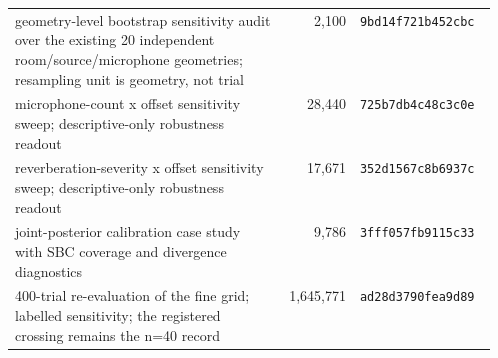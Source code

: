 \begin{tabular}{@{}p{0.56\linewidth}rl@{}}
geometry-level bootstrap sensitivity audit over the existing 20 independent room/source/microphone geometries; resampling unit is geometry, not trial &     2,100 & \texttt{9bd14f721b452cbc} \\
microphone-count x offset sensitivity sweep; descriptive-only robustness readout &    28,440 & \texttt{725b7db4c48c3c0e} \\
reverberation-severity x offset sensitivity sweep; descriptive-only robustness readout &    17,671 & \texttt{352d1567c8b6937c} \\
joint-posterior calibration case study with SBC coverage and divergence diagnostics &     9,786 & \texttt{3fff057fb9115c33} \\
400-trial re-evaluation of the fine grid; labelled sensitivity; the registered crossing remains the n=40 record & 1,645,771 & \texttt{ad28d3790fea9d89} \\
\bottomrule
\end{tabular}
\endgroup
